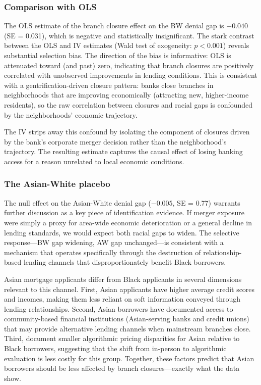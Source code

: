 \documentclass[12pt]{article}
\begin{document}
\subsubsection*{Comparison with OLS} The OLS estimate of the branch closure effect on the BW denial gap is $-0.040$ (SE = 0.031), which is negative and statistically insignificant. The stark contrast between the OLS and IV estimates (Wald test of exogeneity: $p < 0.001$) reveals substantial selection bias. The direction of the bias is informative: OLS is attenuated toward (and past) zero, indicating that branch closures are positively correlated with unobserved improvements in lending conditions. This is consistent with a gentrification-driven closure pattern: banks close branches in neighborhoods that are improving economically (attracting new, higher-income residents), so the raw correlation between closures and racial gaps is confounded by the neighborhoods' economic trajectory.

The IV strips away this confound by isolating the component of closures driven by the bank's corporate merger decision rather than the neighborhood's trajectory. The resulting estimate captures the causal effect of losing banking access for a reason unrelated to local economic conditions.

\subsubsection*{The Asian-White placebo} The null effect on the Asian-White denial gap ($-0.005$, SE = 0.77) warrants further discussion as a key piece of identification evidence. If merger exposure were simply a proxy for area-wide economic deterioration or a general decline in lending standards, we would expect both racial gaps to widen. The selective response---BW gap widening, AW gap unchanged---is consistent with a mechanism that operates specifically through the destruction of relationship-based lending channels that disproportionately benefit Black borrowers.

Asian mortgage applicants differ from Black applicants in several dimensions relevant to this channel. First, Asian applicants have higher average credit scores and incomes, making them less reliant on soft information conveyed through lending relationships. Second, Asian borrowers have documented access to community-based financial institutions (Asian-serving banks and credit unions) that may provide alternative lending channels when mainstream branches close. Third, \citet{bartlett2022} document smaller algorithmic pricing disparities for Asian relative to Black borrowers, suggesting that the shift from in-person to algorithmic evaluation is less costly for this group. Together, these factors predict that Asian borrowers should be less affected by branch closures---exactly what the data show.
\end{document}
